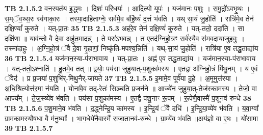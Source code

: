 \documentclass[17pt]{extarticle}
\begin{document}
                  \newline
                                \textbf{ TB 2.1.5.2} \newline
                  वन॒स्पत॑य इ॒द्ध्मः । दिशः॑ परि॒धयः॑ । आ॒दि॒त्यो यूपः॑ । यज॑मानः प॒शुः । स॒मु॒द्रो॑ऽवभृ॒थः । स॒म्ॅव॒थ्स॒रः स्व॑गाका॒रः । तस्मा॒दाहि॑ताग्नेः॒ सर्व॑मे॒व ब॑र्हि॒ष्यं॑ द॒त्तं भ॑वति । यथ् सा॒यं जु॒होति॑ । रात्रि॑मे॒व तेन॑ दक्षि॒ण्यां᳚ कुरुते । यत्-प्रा॒तः \textbf{ 35} \newline
                  \newline
                                \textbf{ TB 2.1.5.3} \newline
                  अह॑रे॒व तेन॑ दक्षि॒ण्यं॑ कुरुते । यत्-ततो॒ ददा॑ति । सा दक्षि॑णा ॥ याव॑न्तो॒ वै दे॒वा अहु॑त॒मादन्न्॑ । ते परा॑ऽभवन्न् । त ए॒तद॑ग्निहो॒त्रꣳ सर्व॑स्यै॒व स॑मव॒दाया॑जुहवुः । तस्मा॑दाहुः । अ॒ग्नि॒हो॒त्रं ॅवै दे॒वा गृ॒हाणां॒ निष्कृ॑ति-मपश्य॒न्निति॑ । यथ्-सा॒यं जु॒होति॑ । रात्रि॑या ए॒व तद्धु॒ताद्या॑य \textbf{ 36} \newline
                  \newline
                                \textbf{ TB 2.1.5.4} \newline
                  यज॑मान॒स्या-प॑राभावाय । यत्-प्रा॒तः । अह्न॑ ए॒व तद्धु॒ताद्या॑य । यज॑मान॒स्या-प॑राभावाय । यत्-ततो॒ऽश्नाति॑ । हु॒तमे॒व तत् ॥ द्वयोः॒ पय॑सा जुहुयात्-प॒शुका॑मस्य । ए॒तद्वा अ॑ग्निहो॒त्रं मि॑थु॒नम् । य ए॒वं ॅवेद॑ । प्र प्र॒जया॑ प॒शुभि॑र्-मिथु॒नैर्-जा॑यते \textbf{ 37} \newline
                  \newline
                                \textbf{ TB 2.1.5.5} \newline
                  इ॒मामे॒व पूर्व॑या दु॒हे । अ॒मूमुत्त॑रया । अ॒धि॒श्रित्योत्त॑र॒मा न॑यति । योना॑वे॒व तद्-रेतः॑ सिञ्चति प्र॒जन॑ने ॥ आज्ये॑न जुहुया॒त्-तेज॑स्कामस्य । तेजो॒ वा आज्य᳚म् । ते॒ज॒स्व्ये॑व भ॑वति । पय॑सा प॒शुका॑मस्य । ए॒तद्वै प॑शू॒नाꣳ रू॒पम् । रू॒पेणै॒वास्मै॑ प॒शूनव॑ रुन्धे \textbf{ 38} \newline
                  \newline
                                \textbf{ TB 2.1.5.6} \newline
                  प॒शु॒माने॒व भ॑वति । द॒द्ध्नेन्द्रि॒य का॑मस्य । इ॒न्द्रि॒यं ॅवै दधि॑ । इ॒न्द्रि॒या॒व्ये॑व भ॑वति । य॒वा॒ग्वा᳚ ग्राम॑कामस्यौष॒धा वै म॑नु॒ष्याः᳚ । भा॒ग॒धेये॑नै॒वास्मै॑ सजा॒तानव॑-रुन्धे । ग्रा॒म्ये॑व भ॑वति ॥अय॑ज्ञो॒ वा ए॒षः । यो॑सा॒मा \textbf{ 39} \newline
                  \newline
                                \textbf{ TB 2.1.5.7} \newline
\end{document}
